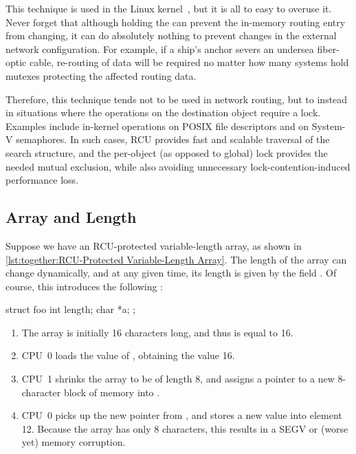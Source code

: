 This technique is used in the Linux kernel~\cite{Arcangeli03}, but it
is all to easy to overuse it.
Never forget that although holding the  can
prevent the in-memory routing entry from changing, it can do absolutely
nothing to prevent changes in the external network configuration.
For example, if a ship's anchor severs an undersea fiber-optic cable,
re-routing of data will be required no matter how many systems hold
mutexes protecting the affected routing data.

Therefore, this technique tends not to be used in network routing, but
to instead in situations where the operations on the destination object
require a lock.
Examples include in-kernel operations on POSIX file descriptors and on
System-V semaphores.
In such cases, RCU provides fast and scalable traversal of the
search structure, and the per-object (as opposed to global) lock
provides the needed mutual exclusion, while also avoiding unnecessary
lock-contention-induced performance loss.

\subsection{Array and Length}
\label{sec:together:Array and Length}

Suppose we have an RCU-protected variable-length array, as shown in
\cref{lst:together:RCU-Protected Variable-Length Array}.
The length of the array  can change dynamically, and at any
given time, its length is given by the field .
Of course, this introduces the following :

\begin{listing}
\begin{VerbatimL}[tabsize=8]
struct foo {
	int length;
	char *a;
};
\end{VerbatimL}
\caption{RCU-Protected Variable-Length Array}
\label{lst:together:RCU-Protected Variable-Length Array}
\end{listing}

\begin{enumerate}
\item	The array is initially 16 characters long, and thus 
	is equal to 16.
\item	CPU~0 loads the value of , obtaining the value 16.
\item	CPU~1 shrinks the array to be of length 8, and assigns a pointer
	to a new 8-character block of memory into .
\item	CPU~0 picks up the new pointer from , and stores a
	new value into element 12.
	Because the array has only 8 characters, this results in
	a SEGV or (worse yet) memory corruption.
\end{enumerate}

